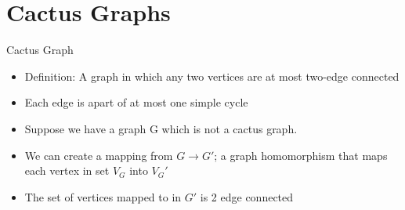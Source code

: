 \documentclass{beamer}
\begin{document}
\section{Cactus Graphs}
\begin{frame}{Cactus Graph}
    \begin{itemize}
        \item Definition: A graph in which any two vertices are at most two-edge connected
        \item Each edge is apart of at most one simple cycle
        \item Suppose we have a graph G which is not a cactus graph. 
        \item We can create a mapping from $G \rightarrow G'$; a graph homomorphism that maps each vertex in set $V_G$ into $V_G'$
        \item The set of vertices mapped to in $G'$ is 2 edge connected 
    \end{itemize}
\end{frame}
\end{document}
